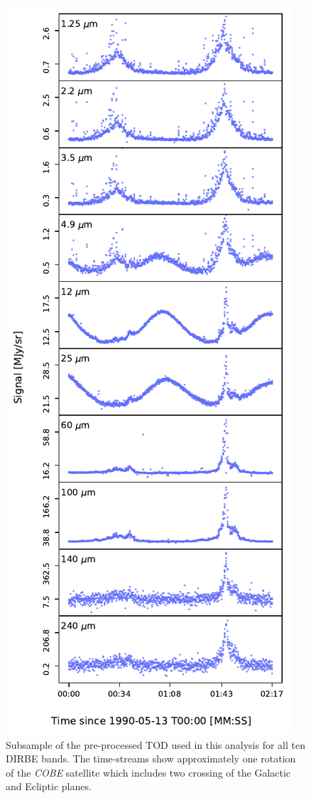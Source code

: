 \documentclass[twocolumn]{aa}
\begin{document}
\begin{figure}
    \centering
    \includegraphics[width=\columnwidth]{figs/tod.pdf}
    \caption{Subsample of the pre-processed TOD used in this analysis for all ten DIRBE bands. The time-streams
	show approximately one rotation of the \textit{COBE} satellite which includes two crossing of the Galactic and Ecliptic planes.}
    \label{fig:tod_zodi}
\end{figure}
\end{document}
